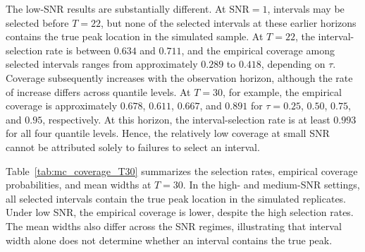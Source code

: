 \documentclass[12pt,a4paper]{article}
\begin{document}
The low-SNR results are substantially different. At $\mathrm{SNR}=1$, intervals may be selected before $T=22$, but none of the selected intervals at these earlier horizons contains the true peak location in the simulated sample. At $T=22$, the interval-selection rate is between $0.634$ and $0.711$, and the empirical coverage among selected intervals ranges from approximately $0.289$ to $0.418$, depending on $\tau$. Coverage subsequently increases with the observation horizon, although the rate of increase differs across quantile levels. At $T=30$, for example, the empirical coverage is approximately $0.678$, $0.611$, $0.667$, and $0.891$ for $\tau=0.25$, $0.50$, $0.75$, and $0.95$, respectively. At this horizon, the interval-selection rate is at least $0.993$ for all four quantile levels. Hence, the relatively low coverage at small SNR cannot be attributed solely to failures to select an interval.

Table~\ref{tab:mc_coverage_T30} summarizes the selection rates, empirical coverage probabilities, and mean widths at $T=30$. In the high- and medium-SNR settings, all selected intervals contain the true peak location in the simulated replicates. Under low SNR, the empirical coverage is lower, despite the high selection rates. The mean widths also differ across the SNR regimes, illustrating that interval width alone does not determine whether an interval contains the true peak.
\end{document}
